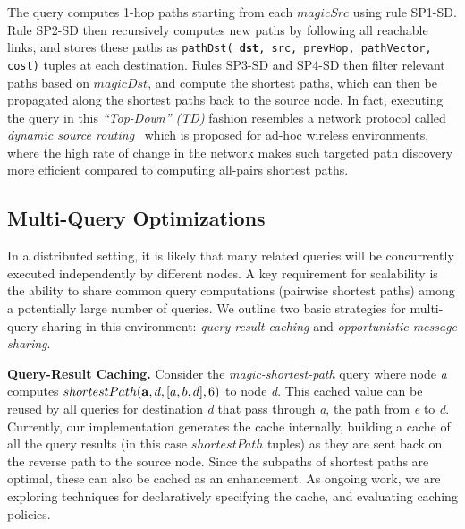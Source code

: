The query computes 1-hop paths starting from each $magicSrc$
using rule SP1-SD. Rule SP2-SD then recursively computes new paths 
by following all reachable links, and stores these paths as
\texttt{pathDst( {\bf dst}, src, prevHop, pathVector, cost)} tuples at each
destination. Rules SP3-SD and SP4-SD then filter relevant paths based on $magicDst$, and compute the
shortest paths, which can then be propagated along the shortest paths back to the source node. In fact,
executing the query in this {\em ``Top-Down'' (TD)\/} fashion
resembles a network protocol called {\em dynamic source
routing}~\cite{dsr} which is proposed for ad-hoc wireless environments, where
the high rate of change in the network makes such targeted path
discovery more efficient compared to computing all-pairs shortest
paths. 


\subsection{Multi-Query Optimizations}
\label{subsec:multiQuerySharing}

In a distributed setting, it is likely that many related queries will be
concurrently executed independently by different nodes. A key requirement for scalability is the
ability to share common query computations (\eg pairwise shortest paths) among a potentially large number
of queries. We outline two basic strategies for multi-query sharing in
this environment: {\em query-result caching} and {\em
  opportunistic message sharing}. 


\vspace*{.3em}\noindent
{\bf Query-Result Caching.\/}
Consider the {\em magic-shortest-path} query where node {\em a} computes
  $shortestPath({\bf a},d,[a,b,d],6)$ to node {\em d}. This cached value
  can be reused by all queries for destination {\em d} that pass
  through {\em a}, \eg the path from {\em e} to {\em d}. Currently, our implementation generates the cache internally, building a cache of all
the query results (in this case $shortestPath$ tuples) as they are sent
back on the reverse path to the source node. Since the subpaths of 
shortest paths are optimal, these can also be cached as an
enhancement. As ongoing work, we are exploring techniques for declaratively specifying
the cache, and evaluating caching policies. 

